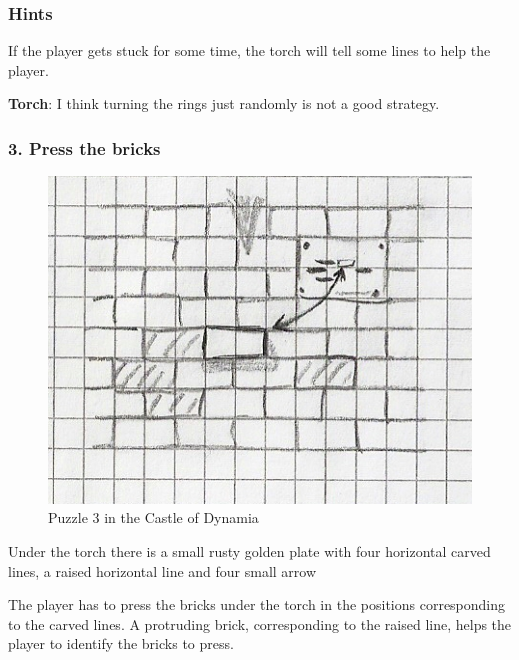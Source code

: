 \subsubsection*{Hints}
If the player gets stuck for some time, the torch will tell some lines to help the player.

\textbf{Torch}: I think turning the rings just randomly is not a good strategy.

\subsubsection{3. Press the bricks}

\begin{figure}[H]
  \centering
  \includegraphics[width=\textwidth]{Images/Puzzles/castleOfDynamia_3}
  \caption{Puzzle 3 in the Castle of Dynamia}
\end{figure}



Under the torch there is a small rusty golden plate with four horizontal carved lines, a raised horizontal line and four small arrow

The player has to press the bricks under the torch in the positions corresponding to the carved lines. A protruding brick, corresponding to the raised line, helps the player to identify the bricks to press.

